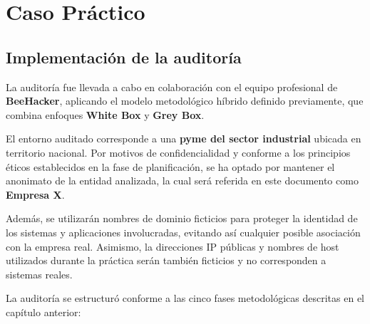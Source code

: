\documentclass[a4paper, 10pt]{article}
\begin{document}
\clearpage




\section{Caso Práctico}

\subsection{Implementación de la auditoría}

La auditoría fue llevada a cabo en colaboración con el equipo profesional de \textbf{BeeHacker}, aplicando el modelo metodológico híbrido definido previamente, 
que combina enfoques \textbf{White Box} y \textbf{Grey Box}. 

\par\vspace{0.4cm}

El entorno auditado corresponde a una \textbf{pyme del sector industrial} ubicada en territorio nacional. Por motivos de confidencialidad y conforme a los principios éticos 
establecidos en la fase de planificación, se ha optado por mantener el anonimato de la entidad analizada, la cual será referida en este documento como \textbf{Empresa X}. 
\par\vspace{0.4cm}

Además, se utilizarán nombres de dominio ficticios para proteger la identidad de los sistemas y aplicaciones involucradas, evitando así cualquier posible asociación con la empresa real. Asimismo, la direcciones IP públicas y nombres de host utilizados durante la práctica serán también ficticios y no corresponden a sistemas reales.

\par\vspace{0.4cm}

La auditoría se estructuró conforme a las cinco fases metodológicas descritas en el capítulo anterior:
\end{document}
